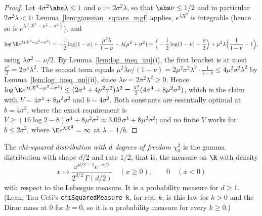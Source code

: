 \begin{proof}
\leanok
{}
Let $4\sigma^2\abs\lambda \le 1$ and $\nu := 2\sigma^2\lambda$, so that $\abs\nu \le 1/2$ and in
particular $2\sigma^2\lambda < 1$: Lemma~\ref{lem:gaussian_square_mgf} applies, $e^{\lambda X^2}$
is integrable (hence so is $e^{\lambda(X^2 - \mu^2 - \sigma^2)}$), and
\[
  \log\E e^{\lambda(X^2 - \mu^2 - \sigma^2)}
  = -\frac12\log(1-\nu) + \frac{\mu^2\lambda}{1-\nu} - \lambda(\mu^2 + \sigma^2)
  = \Big(-\frac12\log(1-\nu) - \frac\nu2\Big) + \mu^2\lambda\Big(\frac{1}{1-\nu} - 1\Big),
\]
using $\lambda\sigma^2 = \nu/2$. By Lemma~\ref{lem:log_ineq_nu}(i), the first bracket is at most
$\frac{\nu^2}{2} = 2\sigma^4\lambda^2$. The second term equals
$\mu^2\lambda\nu/(1-\nu) = 2\mu^2\sigma^2\lambda^2\cdot\frac{1}{1-\nu} \le 4\mu^2\sigma^2\lambda^2$
by Lemma~\ref{lem:log_ineq_nu}(ii), since $\lambda\nu = 2\sigma^2\lambda^2 \ge 0$. Hence
$\log\E e^{\lambda(X^2-\mu^2-\sigma^2)} \le (2\sigma^4 + 4\mu^2\sigma^2)\lambda^2 = \frac{\lambda^2}{2}(4\sigma^4 + 8\mu^2\sigma^2)$,
which is the claim with $V = 4\sigma^4 + 8\mu^2\sigma^2$ and $b = 4\sigma^2$. Both constants are
essentially optimal at $b = 4\sigma^2$, where the exact requirement is
$V \ge (16\log2-8)\sigma^4 + 8\mu^2\sigma^2 \approx 3.09\,\sigma^4 + 8\mu^2\sigma^2$; and no finite
$V$ works for $b \le 2\sigma^2$, where $\E e^{\lambda X^2} = \infty$ at $\lambda = 1/b$.
\end{proof}

\begin{definition}\label{def:chi_squared}
\leanok
The \emph{chi-squared distribution with $d$ degrees of freedom} $\chi^2_d$ is the gamma
distribution with shape $d/2$ and rate $1/2$, that is, the measure on $\R$ with density
\[
  x \mapsto \frac{x^{d/2-1}e^{-x/2}}{2^{d/2}\,\Gamma(d/2)} \quad (x \ge 0), \qquad 0 \quad (x < 0)
\]
with respect to the Lebesgue measure. It is a probability measure for $d \ge 1$.
(Lean: Tau Ceti's \texttt{chiSquaredMeasure k}, for real $k$, is this law for $k > 0$ and the
Dirac mass at $0$ for $k = 0$, so it is a probability measure for every $k \ge 0$.)
\end{definition}

